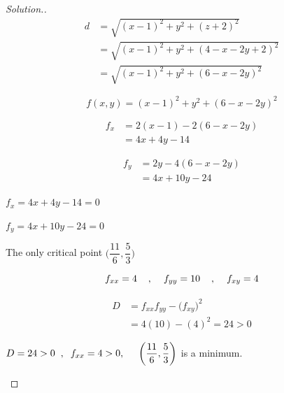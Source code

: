 \documentclass[11pt,a4paper]{article}
\theoremstyle{definition}
\newenvironment{solution}
  {\renewcommand{\qedsymbol}{}\begin{proof}[\textit{Solution}.]}
  {\end{proof}}
\begin{document}
\begin{solution}
\begin{align*}
d & = \sqrt{(x-1)^2 + y^2 + (z + 2)^2}\\
  & = \sqrt{(x-1)^2 + y^2 + (4-x-2y +2)^2}\\
  & = \sqrt{(x-1)^2 + y^2 + (6-x-2y)^2}
\end{align*}

$$f(x,y) = (x-1)^2 + y^2 + (6-x-2y)^2$$

\begin{align*}
f_x & = 2(x -1) -2(6 - x -2y)\\
& = 4x + 4y - 14
\end{align*}

\begin{align*}
f_y & = 2y - 4(6 - x - 2y)\\
& = 4x + 10y - 24
\end{align*}

$f_x = 4x + 4y - 14 = 0$


$f_y = 4x + 10y - 24 = 0$


The only critical point $\bigg(\dfrac{11}{6},\dfrac{5}{3}\bigg)$

$$f_{xx} = 4\hspace{0.4cm}, \hspace{0.4cm} f_{yy} = 10\hspace{0.4cm}, \hspace{0.4cm} f_{xy} = 4$$

\begin{align*}
D & = f_{xx}f_{yy} -\big(f_{xy}\big)^2\\
& = 4(10) - (4)^2 = 24 >0
\end{align*}

$D = 24>0\hspace{0.2cm},\hspace{0.2cm} f_{xx} = 4 >0,\hspace{0.5cm}\bigg(\dfrac{11}{6},\dfrac{5}{3}\bigg)$ is a minimum.


\begin{figure}[H]
\centering
{}
\end{figure}

\vspace{1cm}
\end{solution}
\end{document}
